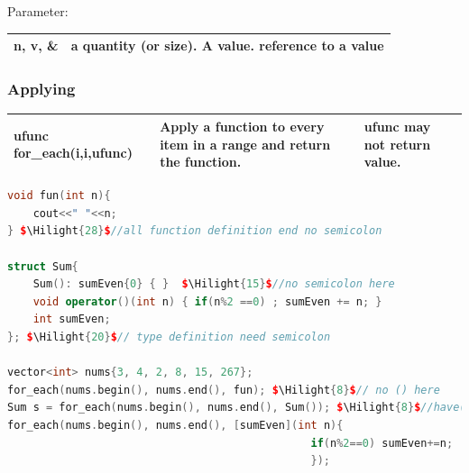 \documentclass[a4paper,12pt,twoside]{book}
\newcommand{\Hilight}[1]{\makebox[0pt][l]{\color{yellow}\rule[-3pt]{#1em}{11pt}}}
\begin{document}
Parameter:  \\
\begin{tabular}{| p{} |p{}|}
\hline n, v, \&  & 	a quantity (or size). A value. reference to a value \\
\hline
\end{tabular}

\subsubsection{Applying}
\begin{tabular}{| p{} |p{}|p{}|}
\hline ufunc for\_each(i,i,ufunc) &Apply a function to every item in a range and return the function. &  ufunc may not return value.  \\
\hline
\end{tabular}

\begin{lstlisting}[frame=single, language=c++, mathescape=true]
void fun(int n){
    cout<<" "<<n;
} $\Hilight{28}$//all function definition end no semicolon

struct Sum{
    Sum(): sumEven{0} { }  $\Hilight{15}$//no semicolon here
    void operator()(int n) { if(n%2 ==0) ; sumEven += n; }
    int sumEven;
}; $\Hilight{20}$// type definition need semicolon

vector<int> nums{3, 4, 2, 8, 15, 267};
for_each(nums.begin(), nums.end(), fun); $\Hilight{8}$// no () here
Sum s = for_each(nums.begin(), nums.end(), Sum()); $\Hilight{8}$//have() here
for_each(nums.begin(), nums.end(), [sumEven](int n){
                                               if(n%2==0) sumEven+=n;
                                               });
\end{lstlisting}
\end{document}
